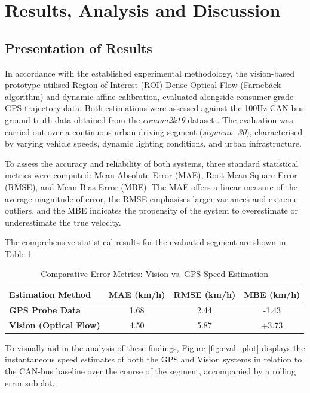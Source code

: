 \section{Results, Analysis and Discussion}

\subsection{Presentation of Results}
In accordance with the established experimental methodology, the vision-based prototype utilised Region of Interest (ROI) Dense Optical Flow (Farnebäck algorithm) and dynamic affine calibration, evaluated alongside consumer-grade GPS trajectory data. Both estimations were assessed against the 100Hz CAN-bus ground truth data obtained from the \textit{comma2k19} dataset \cite{schafer2018commute}. The evaluation was carried out over a continuous urban driving segment (\textit{segment\_30}), characterised by varying vehicle speeds, dynamic lighting conditions, and urban infrastructure.

To assess the accuracy and reliability of both systems, three standard statistical metrics were computed: Mean Absolute Error (MAE), Root Mean Square Error (RMSE), and Mean Bias Error (MBE). The MAE offers a linear measure of the average magnitude of error, the RMSE emphasises larger variances and extreme outliers, and the MBE indicates the propensity of the system to overestimate or underestimate the true velocity.

The comprehensive statistical results for the evaluated segment are shown in Table \ref{tab:error_metrics}.

\begin{table}[htbp]
\centering
\caption{Comparative Error Metrics: Vision vs. GPS Speed Estimation}
\label{tab:error_metrics}
\begin{tabular}{|l|c|c|c|}
\hline
\textbf{Estimation Method} & \textbf{MAE (km/h)} & \textbf{RMSE (km/h)} & \textbf{MBE (km/h)} \\ \hline
\textbf{GPS Probe Data} & 1.68 & 2.44 & -1.43 \\ \hline
\textbf{Vision (Optical Flow)} & 4.50 & 5.87 & +3.73 \\ \hline
\end{tabular}
\end{table}

To visually aid in the analysis of these findings, Figure \ref{fig:eval_plot} displays the instantaneous speed estimates of both the GPS and Vision systems in relation to the CAN-bus baseline over the course of the segment, accompanied by a rolling error subplot.

